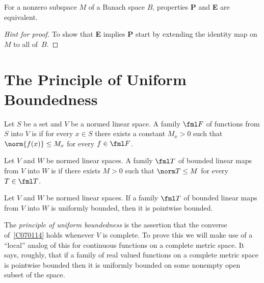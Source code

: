 \begin{prop} For a nonzero subspace $M$ of a Banach space $B$, properties \textbf{P} and \textbf{E} are equivalent.
\end{prop}

\begin{proof}[\emph{Hint for proof}] To show that \textbf{E} implies \textbf{P} start by extending the identity map
on $M$ to all of~$B$.   \ns
\end{proof}

















\section{The Principle of Uniform Boundedness}
\begin{defn} Let $S$ be a set and $V$ be a normed linear space. A family $\fml F$ of
functions from $S$ into $V$ is
 if for every $x \in S$ there exists a constant $M_x > 0$ such that
$\norm{f(x)} \le M_x$ for every $f \in \fml F$.
\end{defn}

\begin{defn} Let $V$ and $W$ be normed linear spaces. A family $\fml T$ of bounded linear maps
from $V$ into $W$ is
 if there exists $M > 0$ such that $\norm T \le M$ for every $T \in
\fml T$.
\end{defn}

\begin{exer}\label{C070114} Let $V$ and $W$ be normed linear spaces. If a family $\fml T$ of
bounded linear maps from $V$ into $W$ is uniformly bounded, then it is pointwise bounded.
\end{exer}

The \emph{principle of uniform boundedness} is the assertion that the converse
of~\ref{C070114} holds whenever $V$ is complete.  To prove this we will make use of a
``local'' analog of this for continuous functions on a complete metric space.  It says, roughly, that if
a family of real valued functions on a complete metric space is pointwise bounded then it is uniformly
bounded on some nonempty open subset of the space.

